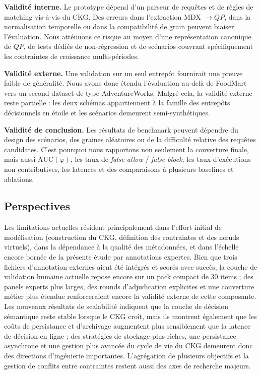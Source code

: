 \documentclass[journal]{IEEEtran}
\begin{document}
\textbf{Validité interne.} Le prototype dépend d'un parseur de requêtes et de règles de matching vis-à-vis du CKG. Des erreurs dans l'extraction MDX $\rightarrow QP$, dans la normalisation temporelle ou dans la compatibilité de grain peuvent biaiser l'évaluation. Nous atténuons ce risque au moyen d'une représentation canonique de $QP$, de tests dédiés de non-régression et de scénarios couvrant spécifiquement les contraintes de croissance multi-périodes.

\textbf{Validité externe.} Une validation sur un seul entrepôt fournirait une preuve faible de généralité. Nous avons donc étendu l'évaluation au-delà de FoodMart vers un second dataset de type AdventureWorks. Malgré cela, la validité externe reste partielle : les deux schémas appartiennent à la famille des entrepôts décisionnels en étoile et les scénarios demeurent semi-synthétiques.

\textbf{Validité de conclusion.} Les résultats de benchmark peuvent dépendre du design des scénarios, des graines aléatoires ou de la difficulté relative des requêtes candidates. C'est pourquoi nous rapportons non seulement la couverture finale, mais aussi $\mathrm{AUC}(\varphi)$, les taux de \emph{false allow} / \emph{false block}, les taux d'exécutions non contributives, les latences et des comparaisons à plusieurs baselines et ablations.

\subsection{Perspectives}

Les limitations actuelles résident principalement dans l'effort initial de modélisation (construction du CKG, définition des contraintes et des nœuds virtuels), dans la dépendance à la qualité des métadonnées, et dans l'échelle encore bornée de la présente étude par annotations expertes. Bien que trois fichiers d'annotation externes aient été intégrés et scorés avec succès, la couche de validation humaine actuelle repose encore sur un pack compact de 30 items ; des panels experts plus larges, des rounds d'adjudication explicites et une couverture métier plus étendue renforceraient encore la validité externe de cette composante. Les nouveaux résultats de scalabilité indiquent que la couche de décision sémantique reste stable lorsque le CKG croît, mais ils montrent également que les coûts de persistance et d'archivage augmentent plus sensiblement que la latence de décision en ligne ; des stratégies de stockage plus riches, une persistance asynchrone et une gestion plus avancée du cycle de vie du CKG demeurent donc des directions d'ingénierie importantes. L'agrégation de plusieurs objectifs et la gestion de conflits entre contraintes restent aussi des axes de recherche majeurs.
\end{document}

